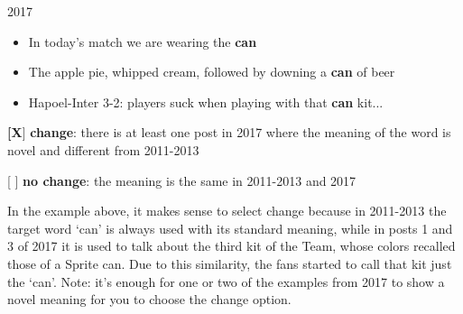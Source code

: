 \documentclass[11pt,a4paper]{article}
\begin{document}
\begin{minipage}{15cm}
\vspace*{0.25cm}

2017
\begin{itemize}
\item In today's match we are wearing the \textbf{can}
\item The apple pie, whipped cream, followed by downing a \textbf{can} of beer
\item Hapoel-Inter 3-2: players suck when playing with that \textbf{can} kit...
\end{itemize}

\vspace*{0.25cm}

\textbf{[X}] \textbf{change}: there is at least one post in 2017 where the meaning of the word is novel and different from 2011-2013

[  ] \textbf{no change}: the meaning is the same in 2011-2013 and 2017

\vspace*{0.25cm}

In the example above, it makes sense to select change because in 2011-2013 the target word `can' is always used with its standard meaning, while in posts 1 and 3 of  2017 it is used to talk about the third kit of the Team, whose colors recalled those of a Sprite can. Due to this similarity, the fans started to call that kit just the `can'. 
Note: it's enough for one or two of the examples from 2017 to show a novel meaning for you to choose the change option.

\end{minipage}

\pagebreak

\clearpage

\end{document}
